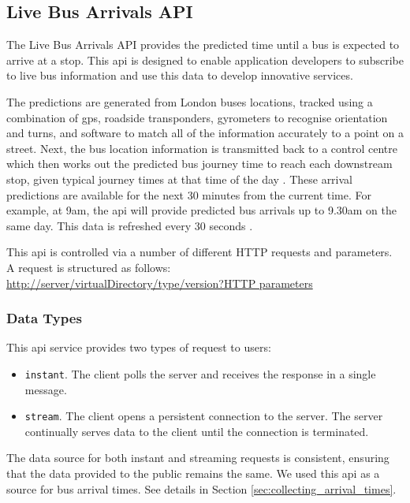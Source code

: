 \subsection{Live Bus Arrivals API}
\par The Live Bus Arrivals API provides the predicted time until a bus is expected to arrive at a stop. This \acrshort{api} is designed to enable application developers to subscribe to live bus information and use this data to develop innovative services\cite{live_bus_api_documentation}.

\par The predictions are generated from London buses locations, tracked using a combination of \acrfull{gps}, roadside transponders, gyrometers to recognise orientation and turns, and software to match all of the information accurately to a point on a street. Next, the bus location information is transmitted back to a control centre which then works out the predicted bus journey time to reach each downstream stop, given typical journey times at that time of the day \cite{quora_generate_countdown}. These arrival predictions are available for the next 30 minutes from the current time. For example, at 9am, the \acrshort{api} will provide predicted bus arrivals up to 9.30am on the same day. This data is refreshed every 30 seconds \cite{live_bus_api_documentation}.

\par This \acrshort{api} is controlled via a number of different HTTP requests and parameters. A request is structured as follows: \\
\url{http://server/virtualDirectory/type/version?HTTP parameters}

\subsubsection{Data Types}

\par This \acrshort{api} service provides two types of request to users:

\begin{itemize}
  \item \texttt{instant}. The client polls the server and receives the response in a single message.
  \item \texttt{stream}. The client opens a persistent connection to the server. The server continually serves data to the client until the connection is terminated.
\end{itemize}

\par The data source for both instant and streaming requests is consistent, ensuring that the data provided to the public remains the same. We used this \acrshort{api} as a source for bus arrival times. See details in Section \ref{sec:collecting_arrival_times}.

